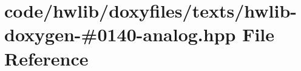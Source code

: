 \hypertarget{hwlib-doxygen-#0140-analog_8hpp}{}\section{code/hwlib/doxyfiles/texts/hwlib-\/doxygen-\/\#0140-\/analog.hpp File Reference}
\label{hwlib-doxygen-#0140-analog_8hpp}

